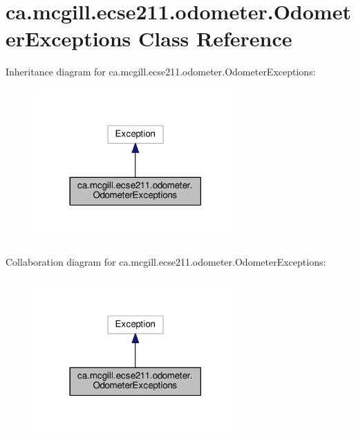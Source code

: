 \hypertarget{classca_1_1mcgill_1_1ecse211_1_1odometer_1_1_odometer_exceptions}{}\section{ca.\+mcgill.\+ecse211.\+odometer.\+Odometer\+Exceptions Class Reference}
\label{classca_1_1mcgill_1_1ecse211_1_1odometer_1_1_odometer_exceptions}


Inheritance diagram for ca.\+mcgill.\+ecse211.\+odometer.\+Odometer\+Exceptions\+:
\nopagebreak
\begin{figure}[H]
\begin{center}
\leavevmode
\includegraphics[width=222pt]{classca_1_1mcgill_1_1ecse211_1_1odometer_1_1_odometer_exceptions__inherit__graph}
\end{center}
\end{figure}


Collaboration diagram for ca.\+mcgill.\+ecse211.\+odometer.\+Odometer\+Exceptions\+:
\nopagebreak
\begin{figure}[H]
\begin{center}
\leavevmode
\includegraphics[width=222pt]{classca_1_1mcgill_1_1ecse211_1_1odometer_1_1_odometer_exceptions__coll__graph}
\end{center}
\end{figure}
